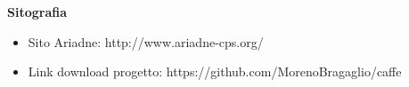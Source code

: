 \documentclass[12pt]{article}
\begin{document}
\newpage
\Large{\textbf{Sitografia}}\\
\begin{itemize}  
\item Sito Ariadne: http://www.ariadne-cps.org/
\item Link download progetto: https://github.com/MorenoBragaglio/caffe
\end{itemize}
\end{document}
